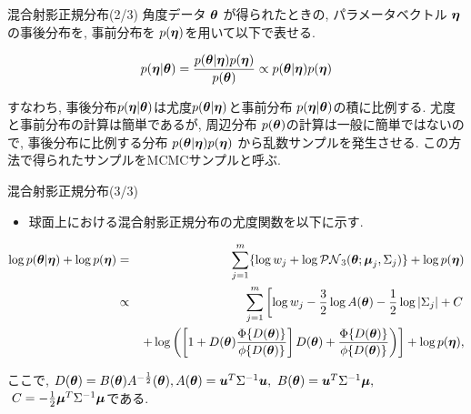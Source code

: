 \documentclass[dvipdfmx]{beamer} %
\newcommand{\bm}[1]{\mbox{\boldmath $#1$}}
\begin{document}
\begin{frame}{混合射影正規分布(2/3)}
角度データ $\bm \theta$ が得られたときの, パラメータベクトル $\bm \eta$の事後分布を, 事前分布を $p(\bm \eta)$を用いて以下で表せる.

\begin{eqnarray*}
\label{BAYES}
p(\bm \eta | \bm \theta) = \frac{p(\bm \theta | \bm \eta) p(\bm \eta)}{p(\bm \theta)} \propto p(\bm \theta | \bm \eta) p(\bm \eta)
\end{eqnarray*}

\noindent
すなわち, 事後分布$p(\bm \eta | \bm \theta)$は尤度$p(\bm \theta | \bm \eta)$と事前分布 $p(\bm \eta| \bm \theta)$の積に比例する. 尤度と事前分布の計算は簡単であるが, 周辺分布 $p(\bm \theta)$の計算は一般に簡単ではないので, 事後分布に比例する分布 $p(\bm \theta | \bm \eta) p(\bm \eta)$ から乱数サンプルを発生させる. この方法で得られたサンプルをMCMCサンプルと呼ぶ. 
\end{frame}
\begin{frame}{混合射影正規分布(3/3)}

\begin{itemize}
	\item 球面上における混合射影正規分布の尤度関数を以下に示す.
\end{itemize}

\vspace{-0.5cm}
\footnotesize %
\begin{eqnarray*}
\label{logPNS}
\log p(\bm \theta | \bm \eta) + \log p(\bm \eta) &=& \sum^m_{j=1} \{\log w_j + \log \mathcal{PN}_3(\bm \theta;\bm \mu_j, \Sigma_j)\} + \log p(\bm \eta) \\
&\propto& \sum^m_{j=1} \left[ \log w_j - \frac{3}{2} \log A(\bm \theta) - \frac{1}{2} \log |\Sigma_j| + C \right. \\
&&\left. + \log \left( \left[1 + D(\bm \theta) \frac{\Phi \{D(\bm \theta)\}}{\phi \{D(\bm \theta)\}} \right] D(\bm \theta) + \frac{\Phi \{D(\bm \theta)\}}{\phi \{D(\bm \theta)\}} \right) \right] + \log p(\bm \eta), 
\end{eqnarray*}
\normalsize

\noindent
ここで, $D(\bm \theta) = B(\bm \theta) A^{-\frac{1}{2}}(\bm \theta),
A(\bm \theta) = \bm u^T \Sigma^{-1} \bm u,\ B(\bm \theta) = \bm u^T \Sigma^{-1} \bm \mu,$ $\ C = -\frac{1}{2} \bm \mu^T \Sigma^{-1} \bm \mu$である.
\end{frame}

\end{document}
